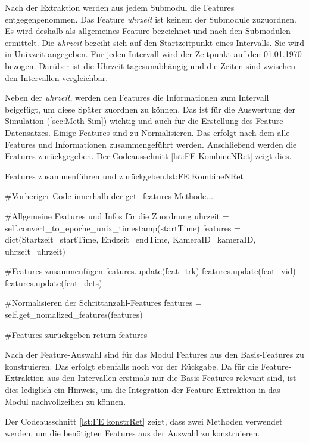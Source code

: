 Nach der Extraktion werden aus jedem Submodul die Features entgegengenommen. Das Feature \textit{uhrzeit} ist keinem der Submodule zuzuordnen. Es wird deshalb als allgemeines Feature bezeichnet und nach den Submodulen ermittelt. Die \textit{uhrzeit} bezeiht sich auf den Startzeitpunkt eines Intervalls. Sie wird in Unixzeit angegeben. Für jeden Intervall wird der Zeitpunkt auf den 01.01.1970 bezogen. Darüber ist die Uhrzeit tagesunabhängig und die Zeiten sind zwischen den Intervallen vergleichbar. \par

Neben der \textit{uhrzeit}, werden den Features die Informationen zum Intervall beigefügt, um diese Später zuordnen zu können. Das ist für die Auswertung der Simulation (\ref{sec:Meth Sim}) wichtig und auch für die Erstellung des Feature-Datensatzes. Einige Features sind zu Normalisieren. Das erfolgt nach dem alle Features und Informationen zusammengeführt werden. Anschließend werden die Features zurückgegeben. Der Codeausschnitt \ref{lst:FE KombineNRet} zeigt dies.

\begin{pythoncode}{Features zusammenführen und zurückgeben.}{lst:FE KombineNRet}

#Vorheriger Code innerhalb der get_features Methode...

#Allgemeine Features und Infos für die Zuordnung
uhrzeit = self.convert_to_epoche_unix_timestamp(startTime)
features = dict(Startzeit=startTime, 
                Endzeit=endTime, 
                KameraID=kameraID, 
                uhrzeit=uhrzeit)

#Features zusammenfügen
features.update(feat_trk)
features.update(feat_vid)
features.update(feat_dets)

#Normalisieren der Schrittanzahl-Features 
features = self.get_nomalized_features(features)

#Features zurückgeben
return features
\end{pythoncode}

Nach der Feature-Auswahl sind für das Modul Features aus den Basis-Features zu konstruieren. Das erfolgt ebenfalls noch vor der Rückgabe. Da für die Feature-Extraktion aus den Intervallen erstmals nur die Basis-Features relevant sind, ist dies lediglich ein Hinweis, um die Integration der Feature-Extraktion in das Modul nachvollzeihen zu können. \par

Der Codeausschnitt \ref{lst:FE konstrRet} zeigt, dass zwei Methoden verwendet werden, um die benötigten Features aus der Auswahl zu konstruieren. 

